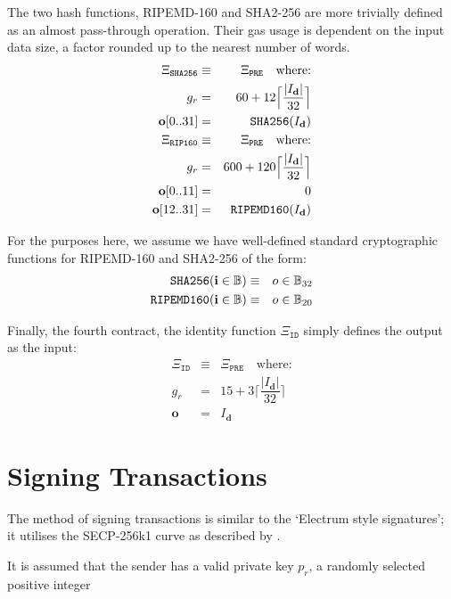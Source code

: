 \documentclass[9pt,oneside]{amsart}
\begin{document}
The two hash functions, RIPEMD-160 and SHA2-256 are more trivially defined as an almost pass-through operation. Their gas usage is dependent on the input data size, a factor rounded up to the nearest number of words.
\begin{eqnarray}
\Xi_{\mathtt{SHA256}} &\equiv& \Xi_{\mathtt{PRE}} \quad \text{where:} \\
g_r &=& 60 + 12\Big\lceil \dfrac{|I_\mathbf{d}|}{32} \Big\rceil\\
\mathbf{o}[0..31] &=& \mathtt{\tiny SHA256}(I_\mathbf{d})\\
\Xi_{\mathtt{RIP160}} &\equiv& \Xi_{\mathtt{PRE}} \quad \text{where:} \\
g_r &=& 600 + 120\Big\lceil \dfrac{|I_\mathbf{d}|}{32} \Big\rceil\\
\mathbf{o}[0..11] &=& 0 \\
\mathbf{o}[12..31] &=& \mathtt{\tiny RIPEMD160}(I_\mathbf{d})\\
\end{eqnarray}

For the purposes here, we assume we have well-defined standard cryptographic functions for RIPEMD-160 and SHA2-256 of the form:
\begin{eqnarray}
\mathtt{\small SHA256}(\mathbf{i} \in \mathbb{B}) & \equiv & o \in \mathbb{B}_{32} \\
\mathtt{\small RIPEMD160}(\mathbf{i} \in \mathbb{B}) & \equiv & o \in \mathbb{B}_{20}
\end{eqnarray}

Finally, the fourth contract, the identity function $\Xi_{\mathtt{ID}}$ simply defines the output as the input:
\begin{eqnarray}
\Xi_{\mathtt{ID}} &\equiv& \Xi_{\mathtt{PRE}} \quad \text{where:} \\
g_r &=& 15 + 3\Big\lceil \dfrac{|I_\mathbf{d}|}{32} \Big\rceil\\
\mathbf{o} &=& I_\mathbf{d}
\end{eqnarray}


\section{Signing Transactions}\label{app:signing}

The method of signing transactions is similar to the `Electrum style signatures'; it utilises the SECP-256k1 curve as described by \cite{gura2004comparing}.

It is assumed that the sender has a valid private key $p_r$, a randomly selected positive integer
\end{document}
